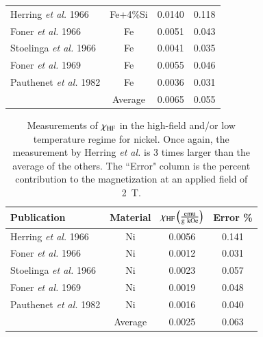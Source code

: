 \documentclass[preprint,12pt]{elsarticle}
\begin{document}
{\begin{table}[h]
\begin{center}
\begin{tabular}{lccc}
Herring {\it et al.} 1966 \cite{Herring1966}&Fe+4\%Si&0.0140&0.118\\
Foner {\it et al.} 1966 \cite{Foner1966}&Fe&0.0051&0.043\\
Stoelinga {\it et al.} 1966 \cite{Stoelinga1966}&Fe&0.0041&0.035\\
Foner {\it et al.} 1969 \cite{Foner1969}&Fe&0.0055&0.046\\
Pauthenet {\it et al.} 1982 \cite{PauthenetMar1982}&Fe&0.0036&0.031\\\hline
~&Average&0.0065&0.055\\
\end{tabular}
\end{center}
\end{table}

\begin{table}[h]
\caption{\label{tab:Ni_chiHF}Measurements of $\chi_{\rm HF}$ in the high-field and/or low temperature regime for nickel. Once again, the measurement by Herring {\it et al.} is 3 times larger than the average of the others. The ``Error" column is the percent contribution to the magnetization at an applied field of 2~T.}
\begin{center}
\begin{tabular}{lccc}\hline
Publication&Material&$\chi_{\rm HF} \left(\frac{\rm emu}{ \rm g~kOe}\right)$&Error \%\\\hline
Herring {\it et al.} 1966 \cite{Herring1966}&Ni&0.0056&0.141\\
Foner {\it et al.} 1966 \cite{Foner1966}&Ni&0.0012&0.031\\
Stoelinga {\it et al.} 1966 \cite{Stoelinga1966}&Ni&0.0023&0.057\\
Foner {\it et al.} 1969 \cite{Foner1969}&Ni&0.0019&0.048\\
Pauthenet {\it et al.} 1982 \cite{PauthenetMar1982}&Ni&0.0016&0.040\\\hline
~&Average&0.0025&0.063\\
\end{tabular}
\end{center}
\end{table}

\FloatBarrier
}
\end{document}

